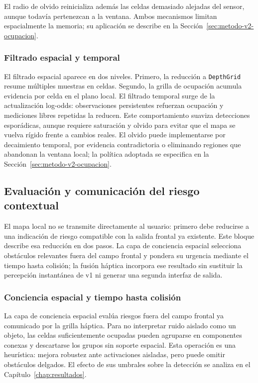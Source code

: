 El radio de olvido reinicializa además las celdas demasiado alejadas del sensor, aunque todavía
pertenezcan a la ventana. Ambos mecanismos limitan espacialmente la memoria; su aplicación se
describe en la Sección~\ref{sec:metodo-v2-ocupacion}.

\subsubsection{Filtrado espacial y temporal}

El filtrado espacial aparece en dos niveles. Primero, la reducción a \texttt{DepthGrid} resume
múltiples muestras en celdas. Segundo, la grilla de ocupación acumula evidencia por celda en
el plano local. El filtrado temporal surge de la actualización log-odds: observaciones
persistentes refuerzan ocupación y mediciones libres repetidas la reducen. Este comportamiento
suaviza detecciones esporádicas, aunque requiere saturación y olvido para evitar que el mapa
se vuelva rígido frente a cambios reales. El olvido puede implementarse por decaimiento temporal,
por evidencia contradictoria o eliminando regiones que abandonan la ventana local; la política
adoptada se especifica en la Sección~\ref{sec:metodo-v2-ocupacion}.

\subsection{Evaluación y comunicación del riesgo contextual}
\label{sec:mt-riesgo-contextual}

El mapa local no se transmite directamente al usuario: primero debe reducirse a una indicación
de riesgo compatible con la salida frontal ya existente. Este bloque describe esa reducción en
dos pasos. La capa de conciencia espacial selecciona obstáculos relevantes fuera del campo
frontal y pondera su urgencia mediante el tiempo hasta colisión; la fusión háptica incorpora ese
resultado sin sustituir la percepción instantánea de v1 ni generar una segunda interfaz de
salida.

\subsubsection{Conciencia espacial y tiempo hasta colisión}

La capa de conciencia espacial evalúa riesgos fuera del campo frontal ya comunicado por la
grilla háptica. Para no interpretar ruido aislado como un objeto, las celdas suficientemente
ocupadas pueden agruparse en componentes conexas y descartarse los grupos sin soporte espacial.
Esta operación es una heurística: mejora robustez ante activaciones aisladas, pero puede omitir
obstáculos delgados. El efecto de sus umbrales sobre la detección se analiza en el
Capítulo~\ref{chap:resultados}.

